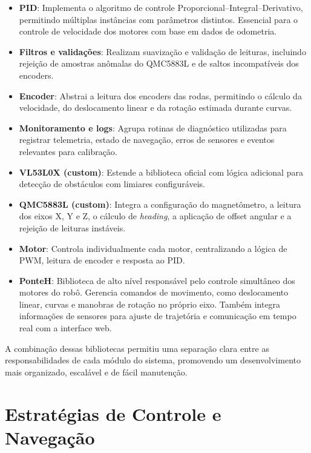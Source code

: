 \documentclass[	12pt, Times, openright, twoside, a4paper, english, brazil]{abntex2}
\begin{document}
\begin{itemize}
		\item \textbf{PID}: Implementa o algoritmo de controle Proporcional–Integral–Derivativo, permitindo múltiplas instâncias com parâmetros distintos. Essencial para o controle de velocidade dos motores com base em dados de odometria.

		\item \textbf{Filtros e validações}: Realizam suavização e validação de leituras, incluindo rejeição de amostras anômalas do QMC5883L e de saltos incompatíveis dos encoders.

		\item \textbf{Encoder}: Abstrai a leitura dos encoders das rodas, permitindo o cálculo da velocidade, do deslocamento linear e da rotação estimada durante curvas.

		\item \textbf{Monitoramento e logs}: Agrupa rotinas de diagnóstico utilizadas para registrar telemetria, estado de navegação, erros de sensores e eventos relevantes para calibração.

		\item \textbf{VL53L0X (custom)}: Estende a biblioteca oficial com lógica adicional para detecção de obstáculos com limiares configuráveis.

		\item \textbf{QMC5883L (custom)}: Integra a configuração do magnetômetro, a leitura dos eixos X, Y e Z, o cálculo de \textit{heading}, a aplicação de offset angular e a rejeição de leituras instáveis.

		\item \textbf{Motor}: Controla individualmente cada motor, centralizando a lógica de PWM, leitura de encoder e resposta ao PID.

		\item \textbf{PonteH}: Biblioteca de alto nível responsável pelo controle simultâneo dos motores do robô. Gerencia comandos de movimento, como deslocamento linear, curvas e manobras de rotação no próprio eixo. Também integra informações de sensores para ajuste de trajetória e comunicação em tempo real com a interface web.
\end{itemize}

A combinação dessas bibliotecas permitiu uma separação clara entre as responsabilidades de cada módulo do sistema, promovendo um desenvolvimento mais organizado, escalável e de fácil manutenção.

\section{Estratégias de Controle e Navegação}
\label{sec:controle_navegacao}
\end{document}
